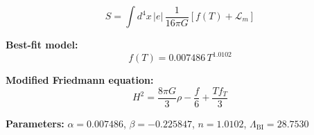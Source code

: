 
\begin{equation}
  S = \int d^4x \, |e| \, \frac{1}{16\pi G} \left[ f(T) + \mathcal{L}_m \right]
\end{equation}

\textbf{Best-fit model:}
\begin{equation}
  f(T) = 0.007486 \, T^{1.0102}
\end{equation}

\textbf{Modified Friedmann equation:}
\begin{equation}
  H^2 = \frac{8\pi G}{3} \rho - \frac{f}{6} + \frac{T f_T}{3}
\end{equation}

\textbf{Parameters:}
$\alpha = 0.007486$, \quad
$\beta = -0.225847$, \quad
$n = 1.0102$, \quad
$\Lambda_{\text{BI}} = 28.7530$